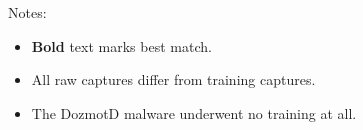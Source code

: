 \documentclass[9pt,journal,compsoc]{IEEEtran}
\begin{document}
\begin{table}[!ht]
Notes:
\begin{itemize}
\item \textbf{Bold} text marks best match.
\item All raw captures differ from training captures.
\item The DozmotD malware underwent no training at all.
\end{itemize}
\end{table}


%
%



%
%
\end{document}
